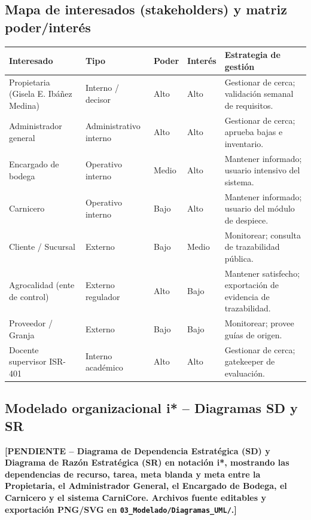 \documentclass[11pt,a4paper]{article}
\newcommand{\PENDIENTE}[1]{\textcolor{pendiente}{\textbf{[PENDIENTE -- #1]}}}
\begin{document}
\subsection{Mapa de interesados (stakeholders) y matriz poder/interés}
\begin{longtable}{|p{3.2cm}|p{2.5cm}|p{2cm}|p{2cm}|p{5cm}|}
\hline
\textbf{Interesado} & \textbf{Tipo} & \textbf{Poder} & \textbf{Interés} & \textbf{Estrategia de gestión} \\
\hline
Propietaria (Gisela E. Ibáñez Medina) & Interno / decisor & Alto & Alto & Gestionar de cerca; validación semanal de requisitos. \\
\hline
Administrador general & Administrativo interno & Alto & Alto & Gestionar de cerca; aprueba bajas e inventario. \\
\hline
Encargado de bodega & Operativo interno & Medio & Alto & Mantener informado; usuario intensivo del sistema. \\
\hline
Carnicero & Operativo interno & Bajo & Alto & Mantener informado; usuario del módulo de despiece. \\
\hline
Cliente / Sucursal & Externo & Bajo & Medio & Monitorear; consulta de trazabilidad pública. \\
\hline
Agrocalidad (ente de control) & Externo regulador & Alto & Bajo & Mantener satisfecho; exportación de evidencia de trazabilidad. \\
\hline
Proveedor / Granja & Externo & Bajo & Bajo & Monitorear; provee guías de origen. \\
\hline
Docente supervisor ISR-401 & Interno académico & Alto & Alto & Gestionar de cerca; gatekeeper de evaluación. \\
\hline
\end{longtable}

\subsection{Modelado organizacional i* -- Diagramas SD y SR}
\PENDIENTE{Diagrama de Dependencia Estratégica (SD) y Diagrama de Razón Estratégica (SR) en notación i*, mostrando las dependencias de recurso, tarea, meta blanda y meta entre la Propietaria, el Administrador General, el Encargado de Bodega, el Carnicero y el sistema CarniCore. Archivos fuente editables y exportación PNG/SVG en \texttt{03\_Modelado/Diagramas\_UML/}.}
\end{document}
